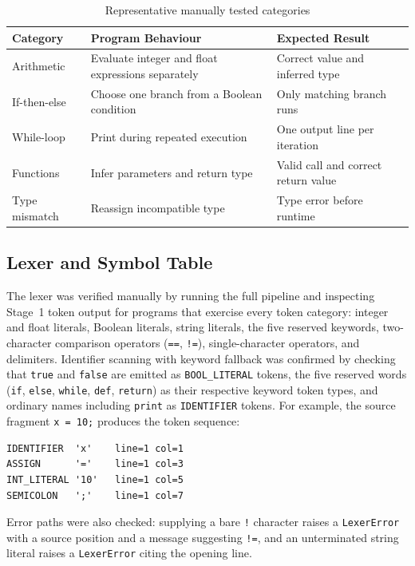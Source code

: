 \begin{table}[H]
\centering
\caption{Representative manually tested categories}
\label{tab:manual-test-cases}
\begin{tabular}{p{3.5cm}p{5cm}p{4cm}}
\toprule
Category & Program Behaviour & Expected Result \\
\midrule
Arithmetic & Evaluate integer and float expressions separately & Correct value and inferred type \\
If-then-else & Choose one branch from a Boolean condition & Only matching branch runs \\
While-loop & Print during repeated execution & One output line per iteration \\
Functions & Infer parameters and return type & Valid call and correct return value \\
Type mismatch & Reassign incompatible type & Type error before runtime \\
\bottomrule
\end{tabular}
\end{table}

\subsection{Lexer and Symbol Table}
The lexer was verified manually by running the full pipeline and inspecting
Stage~1 token output for programs that exercise every token category: integer
and float literals, Boolean literals, string literals, the five reserved keywords,
two-character comparison operators (\texttt{==}, \texttt{!=}), single-character
operators, and delimiters. Identifier scanning with keyword fallback was
confirmed by checking that \texttt{true} and \texttt{false} are emitted as
\texttt{BOOL\_LITERAL} tokens, the five reserved words (\texttt{if},
\texttt{else}, \texttt{while}, \texttt{def}, \texttt{return})
as their respective keyword token types, and ordinary names including
\texttt{print} as \texttt{IDENTIFIER} tokens. For example, the source fragment \texttt{x = 10;}
produces the token sequence:

\begin{lstlisting}
IDENTIFIER  'x'    line=1 col=1
ASSIGN      '='    line=1 col=3
INT_LITERAL '10'   line=1 col=5
SEMICOLON   ';'    line=1 col=7
\end{lstlisting}

Error paths were also checked: supplying a bare \texttt{!} character raises a
\texttt{LexerError} with a source position and a message suggesting
\texttt{!=}, and an unterminated string literal raises a \texttt{LexerError}
citing the opening line.


